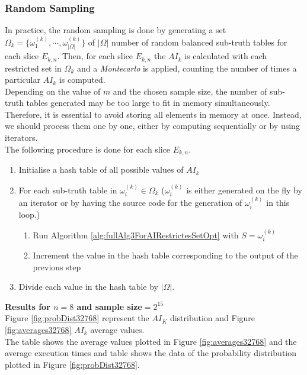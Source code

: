 \documentclass[11pt]{llncs}
\begin{document}
\subsubsection{Random Sampling}
In practice, the random sampling is done by generating a set $\Omega_k = \{\omega_1^{(k)}, \cdots, \omega_{|\Omega|}^{(k)}\}$ of $|\Omega|$ number of random balanced sub-truth tables for each slice $E_{k,n}$. Then, for each slice $E_{k,n}$ the $AI_k$ is calculated with each restricted set in $\Omega_k$ and a \textit{Montecarlo} is applied, counting the number of times a particular $AI_k$ is computed.\\
Depending on the value of $m$ and the chosen sample size, the number of sub-truth tables generated may be too large to fit in memory simultaneously. Therefore, it is essential to avoid storing all elements in memory at once. Instead, we should process them one by one, either by computing sequentially or by using iterators.\\ 

The following procedure is done for each slice $E_{k,n}$.
\begin{enumerate}
    \item Initialise a hash table of all possible values of $AI_k$
    \item For each sub-truth table in $\omega_i^{(k)} \in \Omega_k$ ($\omega_i^{(k)}$ is either generated on the fly by an iterator or by having the source code for the generation of $\omega_i^{(k)}$ in this loop.)
    \begin{enumerate}
        \item Run Algorithm \ref{alg:fullAlg3ForAIRestrictesSetOpt} with $S=\omega_i^{(k)}$\\
        \item Increment the value in the hash table corresponding to the output of the previous step
    \end{enumerate}
    \item Divide each value in the hash table by $|\Omega|$.
\end{enumerate}

\textbf{Results for $n=8$ and sample size$=2^{15}$}\\
Figure \ref{fig:probDist32768} represent the $AI_K$ distribution and Figure \ref{fig:averages32768} $AI_k$ average values.\\
The table  shows the average values plotted in Figure \ref{fig:averages32768} and the average execution times and table  shows the data of the probability distribution plotted in Figure \ref{fig:probDist32768}.
\end{document}

